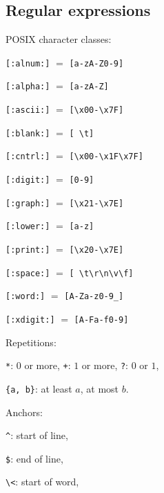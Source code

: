 \subsection{Regular expressions}
\begin{itemx}
\item POSIX character classes:
\begin{itemx}
\item \texttt{[:alnum:]} $=$ \texttt{[a-zA-Z0-9]}
\item \texttt{[:alpha:]} $=$ \texttt{[a-zA-Z]}
\item \texttt{[:ascii:]} $=$ \texttt{[\textbackslash{}x00-\textbackslash{}x7F]}
\item \texttt{[:blank:]} $=$ \texttt{[ \textbackslash{}t]}
\item \texttt{[:cntrl:]} $=$ \texttt{[\textbackslash{}x00-\textbackslash{}x1F\textbackslash{}x7F]}
\item \texttt{[:digit:]} $=$ \texttt{[0-9]}
\item \texttt{[:graph:]} $=$ \texttt{[\textbackslash{}x21-\textbackslash{}x7E]}
\item \texttt{[:lower:]} $=$ \texttt{[a-z]}
\item \texttt{[:print:]} $=$ \texttt{[\textbackslash{}x20-\textbackslash{}x7E]}
\item \texttt{[:space:]} $=$ \texttt{[ \textbackslash{}t\textbackslash{}r\textbackslash{}n\textbackslash{}v\textbackslash{}f]}
\item \texttt{[:word:]} $=$ \texttt{[A-Za-z0-9\_]}
\item \texttt{[:xdigit:]} $=$ \texttt{[A-Fa-f0-9]}
\end{itemx}
\item Repetitions:
\begin{itemx}
\item \texttt{*}: $0$ or more, \texttt{+}: $1$ or more, \texttt{?}: $0$ or $1$,
\item \texttt{\{a, b\}}: at least $a$, at most $b$.
\end{itemx}
\item Anchors:
\begin{itemx}
\item \texttt{\textasciicircum}: start of line,
\item \texttt{\$}: end of line, 
\item \texttt{\textbackslash{}<}: start of word, 

\end{itemx}
\end{itemx}

